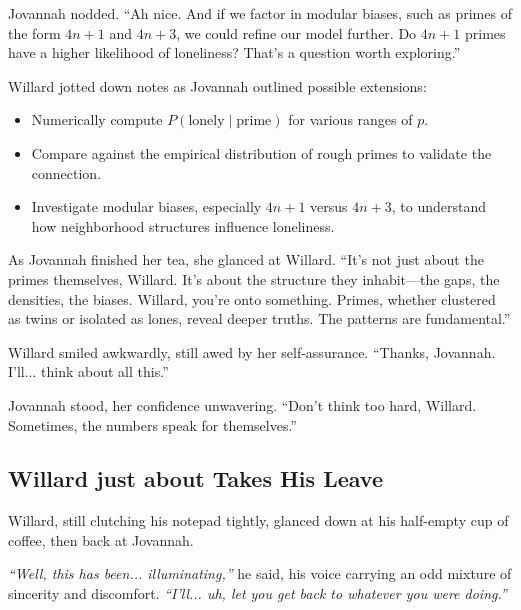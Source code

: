 Jovannah nodded. “Ah nice. And if we factor in modular biases, such as primes of the form \( 4n+1 \) and \( 4n+3 \), we could refine our model further. Do \( 4n+1 \) primes have a higher likelihood of loneliness? That’s a question worth exploring.”

Willard jotted down notes as Jovannah outlined possible extensions:
\begin{itemize}
    \item Numerically compute \( P(\text{lonely} \mid \text{prime}) \) for various ranges of \( p \).
    \item Compare against the empirical distribution of rough primes to validate the connection.
    \item Investigate modular biases, especially \( 4n+1 \) versus \( 4n+3 \), to understand how neighborhood structures influence loneliness.
\end{itemize}

As Jovannah finished her tea, she glanced at Willard. “It’s not just about the primes themselves, Willard. It’s about the structure they inhabit—the gaps, the densities, the biases. Willard, you’re onto something. Primes, whether clustered as twins or isolated as lones, reveal deeper truths. The patterns are fundamental.”
\bigskip

Willard smiled awkwardly, still awed by her self-assurance. “Thanks, Jovannah. I’ll... think about all this.”
\bigskip

Jovannah stood, her confidence unwavering. “Don’t think too hard, Willard. Sometimes, the numbers speak for themselves.”




\subsection*{Willard just about Takes His Leave}

Willard, still clutching his notepad tightly, glanced down at his half-empty cup of coffee, then back at Jovannah. 

\textit{“Well, this has been... illuminating,”} he said, his voice carrying an odd mixture of sincerity and discomfort. \textit{“I’ll... uh, let you get back to whatever you were doing.”}
\bigskip

